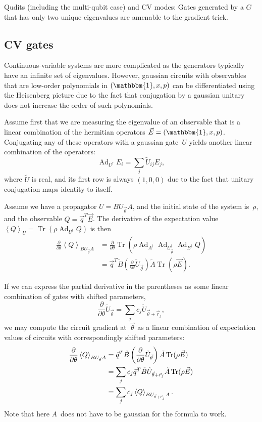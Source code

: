 \documentclass[aps,pra,10pt,twocolumn,groupedaddress,nofootinbib]{revtex4-1}
\theoremstyle{plain}
\DeclareMathOperator{\tr}{Tr}
\DeclareMathOperator{\Ad}{Ad}
\newcommand{\pd}[2]{\frac{\partial #1}{\partial #2}}  %
\newcommand{\be}{\begin{equation}}
\newcommand{\ee}{\end{equation}}
\newcommand{\I}{\mathbbm{1}} %
\newcommand{\expect}[1]{\ensuremath{\left\langle #1 \right\rangle}} %
\newcommand{\Admap}[1]{\tilde{#1}} %
\begin{document}
Qudits (including the multi-qubit case) and CV modes:
Gates generated by a $G$ that has only two unique eigenvalues are amenable to the gradient trick.


\subsection{CV gates}

\newcommand{\vt}{\vec{\theta}}
\newcommand{\vR}{\vec{r}}

Continuous-variable systems are more complicated as the generators typically have an infinite set of eigenvalues.
However, gaussian circuits with observables that are low-order polynomials in $(\I, x, p)$
can be differentiated using the Heisenberg picture due to the fact that conjugation by a gaussian unitary
does not increase the order of such polynomials.

Assume first that we are measuring the eigenvalue of an observable that is a linear combination of the hermitian operators $\vec{E} = (\I, x, p)$.
Conjugating any of these operators with a gaussian gate~$U$ yields another linear combination of the operators:
\be
\Ad_{U^\dagger} E_i = \sum_j \Admap{U}_{ij} E_j,
\ee
where $\Admap{U}$ is real, and its first row
is always $(1,0,0)$ due to the fact that unitary conjugation maps identity to itself.

Assume we have a propagator $U=B U_{\vt} A$, and the initial state of the system is~$\rho$,
and the observable $Q = \vec{q}^T \vec{E}$.
The derivative of the expectation value
$\expect{Q}_U = \tr(\rho \Ad_{U^\dagger}Q)$
is then
\begin{align*}
  \pd{}{\theta} \expect{Q}_{B U_{\vt} A}
  &= \pd{}{\theta} \tr(\rho \Ad_{A^\dagger} \Ad_{U_{\vt}^\dagger} \Ad_{B^\dagger} Q)\\
  &= \vec{q}^T \Admap{B} \left(\pd{}{\theta} \Admap{U}_{\vt}\right) \Admap{A} \tr(\rho \vec{E}).
\end{align*}

If we can express the partial derivative in the parentheses as some linear combination of gates with shifted parameters,
\be
\label{eq:d_cv_shift}
\pd{}{\theta} \Admap{U}_{\vt} = \sum_j c_j \Admap{U}_{\vt+\vR_j},
\ee
we may compute the circuit gradient at~$\vt$ as a linear combination of expectation values
of circuits with correspondingly shifted parameters:
\begin{align}
\label{eq:d_ev1_cv}
\notag
\pd{}{\theta} \expect{Q}_{B U_{\vt} A}
&= \vec{q}^T \Admap{B} \left(\pd{}{\theta} \Admap{U}_{\vt}\right) \Admap{A} \tr(\rho \vec{E})\\
\notag
&= \sum_j c_j \vec{q}^T \Admap{B} \Admap{U}_{\vt+\vR_j} \Admap{A} \tr(\rho \vec{E})\\
&= \sum_j c_j \expect{Q}_{B U_{\vt+\vR_j} A}.
\end{align}
Note that here $A$~does not have to be gaussian for the formula to work.
\end{document}

